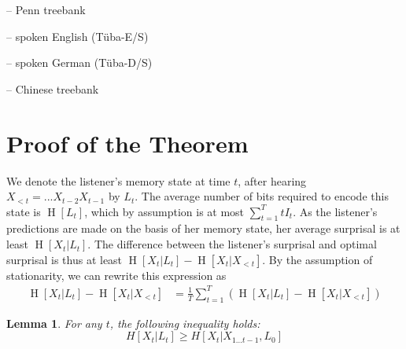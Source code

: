 \documentclass[11pt,letterpaper]{article}
\newcounter{theorem}
\newtheorem{lemma}[theorem]{Lemma}
\begin{document}
-- Penn treebank \citep{marcus-building-1993}

-- spoken English (T{\"u}ba-E/S)

-- spoken German (T{\"u}ba-D/S)

-- Chinese treebank \citep{xue-chinese-2013}


\section{Proof of the Theorem}



	We denote the listener's memory state at time $t$, after hearing $X_{<t} = ... X_{t-2} X_{t-1}$ by $L_t$.
	The average number of bits required to encode this state is $\operatorname{H}[L_t]$, which by assumption is at most $\sum_{t=1}^T t I_t$.
	As the listener's predictions are made on the basis of her memory state, her average surprisal is at least $\operatorname{H}[X_t | L_t]$.
	The difference between the listener's surprisal and optimal surprisal is thus at least $\operatorname{H}[X_t | L_t] - \operatorname{H}[X_t | X_{<t}]$.
By the assumption of stationarity, we can rewrite this expression as
\begin{align*}
	\operatorname{H}[X_t | L_t] - \operatorname{H}[X_t | X_{<t}] &=  \frac{1}{T} \sum_{t=1}^{T} \left(\operatorname{H}[X_t | L_t] - \operatorname{H}[X_t | X_{<t}]\right) 
\end{align*}
	\begin{lemma}
For any $t$, the following inequality holds:
	\begin{equation}
H[X_t | L_t] \geq H[X_t|X_{1 \dots t-1}, L_0]
		\end{equation}
	\end{lemma}
\end{document}

